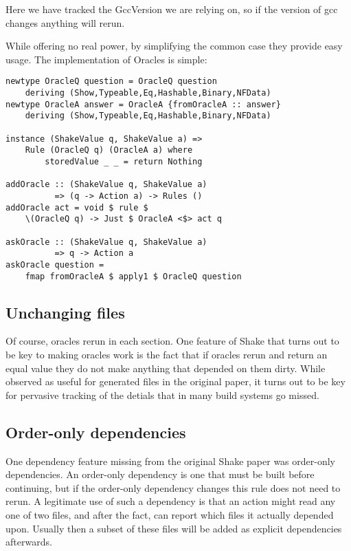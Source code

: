 Here we have tracked the GccVersion we are relying on, so if the version of gcc changes anything will rerun.

While offering no real power, by simplifying the common case they provide easy usage. The implementation of Oracles is simple:

\begin{lstlisting}
newtype OracleQ question = OracleQ question
    deriving (Show,Typeable,Eq,Hashable,Binary,NFData)
newtype OracleA answer = OracleA {fromOracleA :: answer}
    deriving (Show,Typeable,Eq,Hashable,Binary,NFData)

instance (ShakeValue q, ShakeValue a) =>
    Rule (OracleQ q) (OracleA a) where
        storedValue _ _ = return Nothing

addOracle :: (ShakeValue q, ShakeValue a)
          => (q -> Action a) -> Rules ()
addOracle act = void $ rule $
    \(OracleQ q) -> Just $ OracleA <$> act q

askOracle :: (ShakeValue q, ShakeValue a)
          => q -> Action a
askOracle question =
    fmap fromOracleA $ apply1 $ OracleQ question
\end{lstlisting}

\subsection{Unchanging files}

Of course, oracles rerun in each section. One feature of Shake that turns out to be key to making oracles work is the fact that if oracles rerun and return an equal value they do not make anything that depended on them dirty. While observed as useful for generated files in the original paper, it turns out to be key for pervasive tracking of the detials that in many build systems go missed.

\subsection{Order-only dependencies}

One dependency feature missing from the original Shake paper was order-only dependencies. An order-only dependency is one that must be built before continuing, but if the order-only dependency changes this rule does not need to rerun. A legitimate use of such a dependency is that an action might read any one of two files, and after the fact, can report which files it actually depended upon. Usually then a subset of these files will be added as explicit dependencies afterwards.

